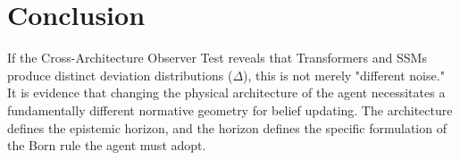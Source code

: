 \documentclass[12pt,a4paper]{article}
\begin{document}
\section{Conclusion}

If the Cross-Architecture Observer Test reveals that Transformers and SSMs produce distinct deviation distributions ($\Delta$), this is not merely "different noise." It is evidence that changing the physical architecture of the agent necessitates a fundamentally different normative geometry for belief updating. The architecture defines the epistemic horizon, and the horizon defines the specific formulation of the Born rule the agent must adopt.
\end{document}
